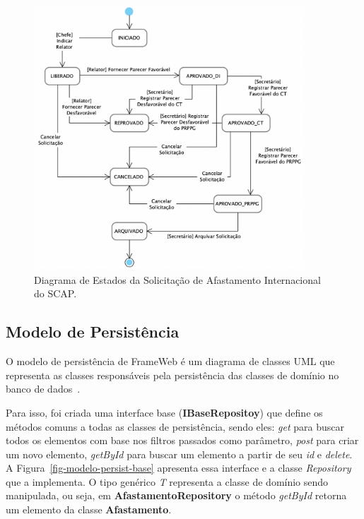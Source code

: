 \begin{figure}[h!]
    \centering
    \includegraphics[width=0.9\textwidth]{figuras/fig-diagrama-estado-internacional.png}
    \caption{Diagrama de Estados da Solicitação de Afastamento Internacional do SCAP.}
    \label{fig-diagrama-estado-internacional}
\end{figure}

\FloatBarrier


\subsection{Modelo de Persistência}
\label{subsec-frameweb-persistencia}

O modelo de persistência de FrameWeb é um diagrama de classes UML que representa
as classes responsáveis pela persistência das classes de domínio no banco de dados~\cite{souza:2007}.

Para isso, foi criada uma interface base (\textbf{IBaseRepositoy}) que define os métodos comuns a todas as classes de persistência,
sendo eles: \textit{get} para buscar todos os elementos com base nos filtros passados como parâmetro,
\textit{post} para criar um novo elemento, \textit{getById} para buscar um elemento a partir de seu
\textit{id} e \textit{delete}. A Figura~\ref{fig-modelo-persist-base} apresenta essa interface e a
classe \textit{Repository} que a implementa. O tipo genérico \textit{T} representa a classe de domínio
sendo manipulada, ou seja, em \textbf{AfastamentoRepository} o método \textit{getById}
retorna um elemento da classe \textbf{Afastamento}.


